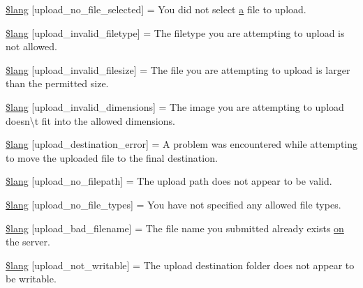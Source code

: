 \begin{DoxyCompactItemize}
\item 
\hyperlink{_admin_2system_2language_2english_2upload__lang_8php_a88d8e8f9b879d1c25e6c089f3d3b5a30}{\$lang} \mbox{[}\textquotesingle{}upload\+\_\+no\+\_\+file\+\_\+selected\textquotesingle{}\mbox{]} = \textquotesingle{}You did not select \hyperlink{_admin_2assets_2js_2bootstrap_8min_8js_a1f5870dcf487187f13d5fd328ed9e6e7}{a} file to upload.\textquotesingle{}
\item 
\hyperlink{_admin_2system_2language_2english_2upload__lang_8php_ac8631aa85ed80396bd78e91a76d5fd38}{\$lang} \mbox{[}\textquotesingle{}upload\+\_\+invalid\+\_\+filetype\textquotesingle{}\mbox{]} = \textquotesingle{}The filetype you are attempting to upload is not allowed.\textquotesingle{}
\item 
\hyperlink{_admin_2system_2language_2english_2upload__lang_8php_a832b3ec1d84b1d48a488cf525954d8f2}{\$lang} \mbox{[}\textquotesingle{}upload\+\_\+invalid\+\_\+filesize\textquotesingle{}\mbox{]} = \textquotesingle{}The file you are attempting to upload is larger than the permitted size.\textquotesingle{}
\item 
\hyperlink{_admin_2system_2language_2english_2upload__lang_8php_a4e796eeccf7df90acffea7884a5bd558}{\$lang} \mbox{[}\textquotesingle{}upload\+\_\+invalid\+\_\+dimensions\textquotesingle{}\mbox{]} = \textquotesingle{}The image you are attempting to upload doesn\textbackslash{}\textquotesingle{}t fit into the allowed dimensions.\textquotesingle{}
\item 
\hyperlink{_admin_2system_2language_2english_2upload__lang_8php_a31be70c748b9bfc43dd7468e1fa64c42}{\$lang} \mbox{[}\textquotesingle{}upload\+\_\+destination\+\_\+error\textquotesingle{}\mbox{]} = \textquotesingle{}A problem was encountered while attempting to move the uploaded file to the final destination.\textquotesingle{}
\item 
\hyperlink{_admin_2system_2language_2english_2upload__lang_8php_a3c17908c53072c6a5ef593760aaaa704}{\$lang} \mbox{[}\textquotesingle{}upload\+\_\+no\+\_\+filepath\textquotesingle{}\mbox{]} = \textquotesingle{}The upload path does not appear to be valid.\textquotesingle{}
\item 
\hyperlink{_admin_2system_2language_2english_2upload__lang_8php_ab188c98e583c81905dedaad54ad452bb}{\$lang} \mbox{[}\textquotesingle{}upload\+\_\+no\+\_\+file\+\_\+types\textquotesingle{}\mbox{]} = \textquotesingle{}You have not specified any allowed file types.\textquotesingle{}
\item 
\hyperlink{_admin_2system_2language_2english_2upload__lang_8php_abb379322384f3f35952a539c63e2c8f7}{\$lang} \mbox{[}\textquotesingle{}upload\+\_\+bad\+\_\+filename\textquotesingle{}\mbox{]} = \textquotesingle{}The file name you submitted already exists \hyperlink{how_to_play_8js_af1f111425a03a603c02a2abf44ad8c43}{on} the server.\textquotesingle{}
\item 
\hyperlink{_admin_2system_2language_2english_2upload__lang_8php_aed6bfb5a9094179427f61fcbb582145b}{\$lang} \mbox{[}\textquotesingle{}upload\+\_\+not\+\_\+writable\textquotesingle{}\mbox{]} = \textquotesingle{}The upload destination folder does not appear to be writable.\textquotesingle{}
\end{DoxyCompactItemize}


